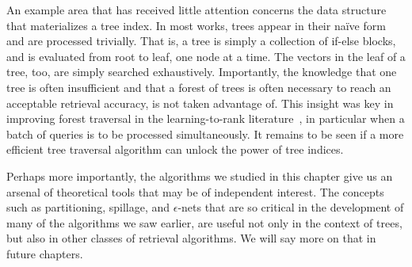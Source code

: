 An example area that has received little attention concerns the
data structure that materializes a tree index.
In most works, trees appear in their na\"ive form and are processed trivially.
That is, a tree is simply a collection of if-else blocks,
and is evaluated from root to leaf, one node at a time. The vectors in the leaf
of a tree, too, are simply searched exhaustively.
Importantly, the knowledge that one tree is often insufficient and that a forest
of trees is often necessary to reach an acceptable retrieval accuracy, is not
taken advantage of.
This insight was key in improving forest traversal in the learning-to-rank
literature~\citep{quickscorer,ye2018rapidscorer}, in particular when
a batch of queries is to be processed simultaneously.
It remains to be seen if a more efficient tree traversal algorithm
can unlock the power of tree indices.

Perhaps more importantly, the algorithms we studied in this chapter give
us an arsenal of theoretical tools that may be of independent interest.
The concepts such as partitioning, spillage, and $\epsilon$-nets that are so
critical in the development of many of the algorithms we saw earlier,
are useful not only in the context of trees, but also in other classes
of retrieval algorithms. We will say more on that in future chapters.



